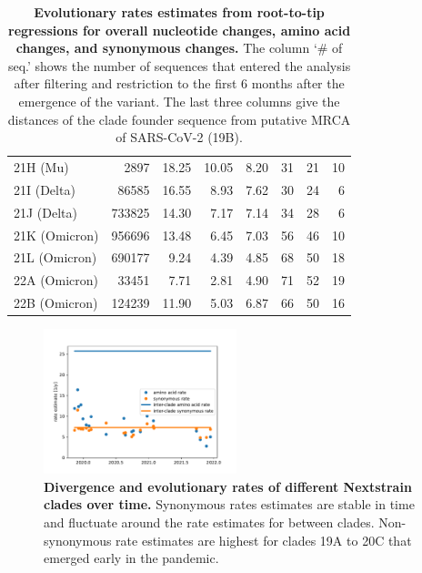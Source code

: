 \documentclass[aps,rmp, twocolumn]{revtex4}
\begin{document}
\begin{table}
\begin{tabular}{l|rrrrrrr}
    21H (Mu) &      2897 & 18.25 &    10.05 &      8.20 &       31 &      21 &       10 \\
    21I (Delta) &   86585 & 16.55 &     8.93 &      7.62 &       30 &      24 &        6 \\
    21J (Delta) &   733825 & 14.30 &     7.17 &      7.14 &       34 &      28 &        6 \\
    21K (Omicron) & 956696 & 13.48 &     6.45 &      7.03 &       56 &      46 &       10 \\
    21L (Omicron) & 690177 & 9.24 &     4.39 &      4.85 &       68 &      50 &       18 \\
    22A (Omicron) & 33451 & 7.71 &     2.81 &      4.90 &       71 &      52 &       19 \\
    22B (Omicron) & 124239 & 11.90 &     5.03 &      6.87 &       66 &      50 &       16 \\
           \hline
    \end{tabular}
\caption{{\bf Evolutionary rates estimates from root-to-tip regressions for overall nucleotide changes, amino acid changes, and synonymous changes.}
The column `\# of seq.' shows the number of sequences that entered the analysis after filtering and restriction to the first 6 months after the emergence of the variant.
    The last three columns give the distances of the clade founder sequence from putative MRCA of SARS-CoV-2 (19B).
\label{tab:rates}}
\end{table}

\begin{figure}
    \includegraphics[width=0.5\textwidth]{figures/rate_progression.pdf}
    \caption{{\bf Divergence and evolutionary rates of different Nextstrain clades over time.} Synonymous rates estimates are stable in time and fluctuate around the rate estimates for between clades. Non-synonymous rate estimates are highest for clades 19A to 20C that emerged early in the pandemic.
    \label{fig:rate_progression} }
\end{figure}
\end{document}
